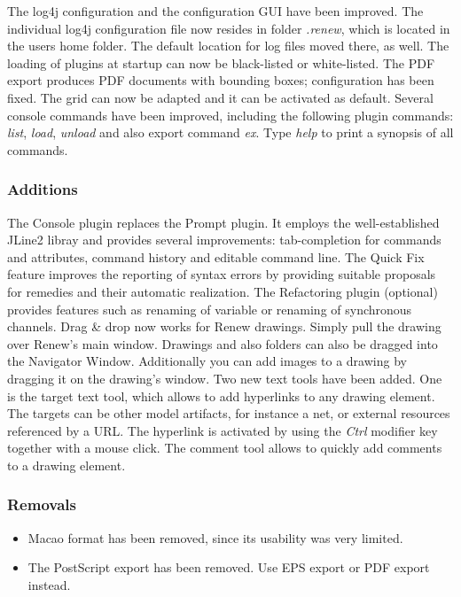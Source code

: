 The log4j configuration and the configuration GUI have been improved. 
The individual log4j configuration file now resides in folder \emph{.renew}, 
which is located in the users home folder. The default location for log files moved there, as well.
The loading of plugins at startup can now be black-listed or white-listed.
The PDF export produces  PDF documents with bounding boxes; configuration has been fixed.
The grid can now be adapted and it can be activated as default.
Several console commands have been improved, including the
following plugin commands: \emph{list}, \emph{load},
\emph{unload} and also  export command \emph{ex}. Type \emph{help}
to print a synopsis of all commands.

\subsubsection*{Additions}
The Console plugin replaces the Prompt plugin. 
It employs the well-established JLine2 libray and provides several improvements:
tab-completion for commands and attributes, command history and editable command line.
The Quick Fix feature improves the reporting of syntax errors by
providing suitable proposals for remedies and their automatic
realization.
The Refactoring plugin (optional) provides features such as renaming
of variable or renaming of synchronous channels.
Drag \& drop now works for Renew drawings. Simply pull the drawing
over Renew's main window. Drawings and also folders can also be
dragged into the Navigator Window. Additionally you can add images to
a drawing by dragging it on the drawing's window.
Two new text tools have been added. One is the target text tool, which
allows to add hyperlinks to any drawing element. The targets can be
other model artifacts, for instance a net, or external resources
referenced by a URL. The hyperlink is activated by using the
\emph{Ctrl} modifier key together with a mouse click.
The comment tool allows to quickly add comments to a drawing element.
    
\subsubsection{Removals}
\begin{itemize}
\item Macao format has been removed, since its usability was very limited.
\item The PostScript export has been removed. Use EPS export or PDF export instead.
\end{itemize}




